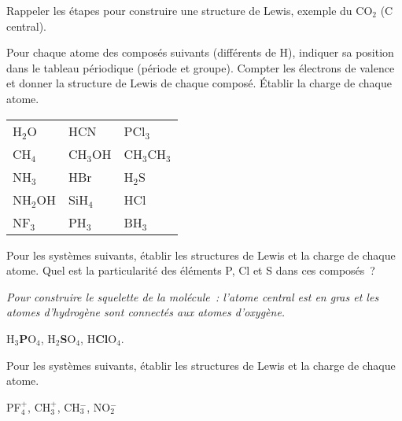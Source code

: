 

Rappeler les \'etapes pour construire une structure de Lewis, exemple du CO$_2$ 
(C central).


Pour chaque atome des compos\'es suivants  (diff\'erents de H), indiquer sa position dans 
le tableau p\'eriodique (p\'eriode et groupe). Compter les \'electrons de valence
et donner la structure de Lewis de chaque compos\'e. 
\'Etablir la charge de chaque atome.

\begin{center}
\begin{tabular}{lll}
\hline                                           
H$_2$O      & HCN      & PCl$_3$                   \\
CH$_4$      & CH$_3$OH & CH$_3$CH$_3$              \\
NH$_3$      & HBr      & H$_2$S                    \\
NH$_2$OH    & SiH$_4$  & HCl                       \\
NF$_3$      & PH$_3$   & BH$_3$                    \\
\hline
\end{tabular}
\end{center}


Pour les syst\`emes suivants, \'etablir les structures de Lewis et la charge de chaque atome.
Quel est la particularit\'e des \'el\'ements P, Cl et S dans ces compos\'es~?

{\small \textit{Pour construire le squelette de la mol\'ecule~: l'atome central est en gras et les atomes d'hydrog\`ene 
sont connect\'es aux atomes d'oxyg\`ene.}}

\vspace{0.5cm}

\centerline{H$_3$\textbf{P}O$_4$, H$_2$\textbf{S}O$_4$, H\textbf{Cl}O$_4$.}


Pour les syst\`emes suivants, \'etablir les structures de Lewis et la charge de chaque atome.

\centerline{PF$_4^+$, CH$_3^+$, CH$_3^-$, NO$_2^-$}

%
%
%
%
